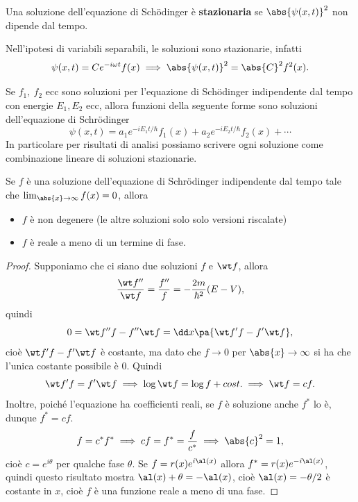 \begin{definition}
Una soluzione dell'equazione di Sch\"odinger \`e \textbf{stazionaria} se $\abs{\psi(x,t)}^2$ non dipende dal tempo.
\end{definition}

\begin{remark}
Nell'ipotesi di variabili separabili, le soluzioni sono stazionarie, infatti
\[\psi(x,t)=Ce^{-i\omega t}f(x)\implies \abs{\psi(x,t)}^2=\abs{C}^2f^2(x).\] 
\end{remark}


\begin{remark}
Se $f_1,\ f_2$ ecc sono soluzioni per l'equazione di Sch\"odinger indipendente dal tempo con energie $E_1, E_2$ ecc, allora funzioni della seguente forme sono soluzioni dell'equazione di Schr\"odinger
\[\psi(x,t)=a_1e^{-iE_1 t/\hbar}f_1(x)+a_2e^{-iE_2 t/\hbar}f_2(x)+\cdots\]
In particolare per risultati di analisi possiamo scrivere ogni soluzione come combinazione lineare di soluzioni stazionarie.
\end{remark}




\begin{remark}
Se $f$ \`e una soluzione dell'equazione di Schr\"odinger indipendente dal tempo tale che $\lim_{\abs{x}\to\infty} f(x)=0$, allora
\begin{itemize}
\item $f$ \`e non degenere (le altre soluzioni solo solo versioni riscalate)
\item $f$ \`e reale a meno di un termine di fase.
\end{itemize}
\end{remark}
\begin{proof}
Supponiamo che ci siano due soluzioni $f$ e $\wt f$, allora
\[\frac{\wt f''}{\wt f}=\frac{f''}f=-\frac{2m}{\hbar^2}(E-V),\]
quindi
\[0=\wt f'' f-f''\wt f=\dd x{}\pa{\wt f' f-f'\wt f},\]
cio\`e $\wt f' f-f'\wt f$ \`e costante, ma dato che $f\to 0$ per $\abs{x}\to\infty$ si ha che l'unica costante possibile \`e $0$. Quindi
\[\wt f'f=f'\wt f\implies \log \wt f=\log f + cost.\implies \wt f=cf.\]
Inoltre, poich\'e l'equazione ha coefficienti reali, se $f$ \`e soluzione anche $f^\ast$ lo \`e, dunque $f^\ast=cf$.
\[f=c^\ast f^\ast\implies cf=f^\ast=\frac f{c^\ast}\implies \abs{c}^2=1,\]
cio\`e $c=e^{i\theta}$ per qualche fase $\theta$. Se $f=r(x)e^{i\al(x)}$ allora $f^\ast=r(x)e^{-i\al(x)}$, quindi questo risultato mostra $\al(x)+\theta=-\al(x)$, cio\`e $\al(x)=-\theta/2$ \`e costante in $x$, cio\`e $f$ \`e una funzione reale a meno di una fase.
\end{proof}



